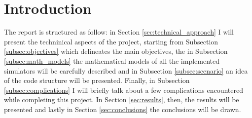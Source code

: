 \section{Introduction} %
\label{sec:introduction}

The report is structured as follow: in Section \ref{sec:technical_approach} I will present the techninical aspects of the project, starting from Subsection \ref{subsec:objectives} which delineates the main objectives, the in Subsection \ref{subsec:math_models} the mathematical models of all the implemented simulators will be carefully described and in Subsection \ref{subsec:scenario} an idea of the code structure will be presented. Finally, in Subsection \ref{subsec:complications} I will briefly talk about a few complications encountered while completing this project. In Section \ref{sec:results}, then, the results will be presented and lastly in Section \ref{sec:conclusions} the conclusions will be drawn.